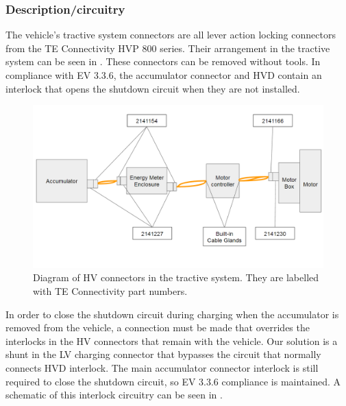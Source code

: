 \documentclass{article}
\begin{document}
\subsubsection{Description/circuitry}
The vehicle's tractive system connectors are all lever action locking connectors from the TE Connectivity HVP 800 series. Their arrangement in the tractive system can be seen in . These connectors can be removed without tools. In compliance with EV 3.3.6, the accumulator connector and HVD contain an interlock that opens the shutdown circuit when they are not installed.

  \begin{figure}[H]
        \centering
        \includegraphics[width=.75\textwidth]{HV_connector_diagram.png}
        \caption{Diagram of HV connectors in the tractive system. They are labelled with TE Connectivity part numbers.}
        \label{fig:HV_connector_diagram}
  \end{figure}

In order to close the shutdown circuit during charging when the accumulator is removed from the vehicle, a connection must be made that overrides the interlocks in the HV connectors that remain with the vehicle. Our solution is a shunt in the LV charging connector that bypasses the circuit that normally connects HVD interlock. The main accumulator connector interlock is still required to close the shutdown circuit, so EV 3.3.6 compliance is maintained. A schematic of this interlock circuitry can be seen in .
\end{document}
